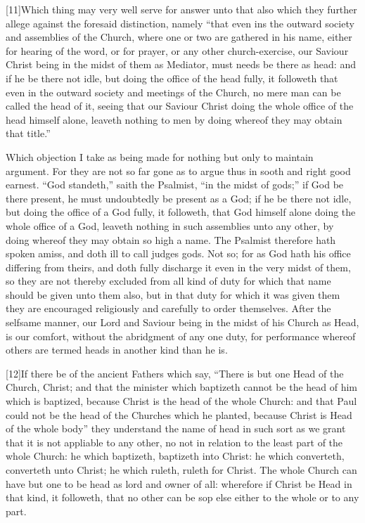 [11]Which thing may very well serve for answer unto that also which they further allege against the foresaid distinction, namely “that even ins the outward society and assemblies of the Church, where one or two are gathered in his name, either for hearing of the word, or for prayer, or any other church-exercise, our Saviour Christ being in the midst of them as Mediator, must needs be there as head: and if he be there not idle, but doing the office of the head fully, it followeth that even in the outward society and meetings of the Church, no mere man can be called the head of it, seeing that our Saviour Christ doing the whole office of the head himself alone, leaveth nothing to men by doing whereof they may obtain that title.”

Which objection I take as being made for nothing but only to maintain argument. For they are not so far gone as to argue thus in sooth and right good earnest. “God standeth,” saith the Psalmist, “in the midst of gods;” if God be there present, he must undoubtedly be present as a God; if he be there not idle, but doing the office of a God fully, it followeth,  that God himself alone doing the whole office of a God, leaveth nothing in such assemblies unto any other, by doing whereof they may obtain so high a name. The Psalmist therefore hath spoken amiss, and doth ill to call judges gods. Not so; for as God hath his office differing from theirs, and doth fully discharge it even in the very midst of them, so they are not thereby excluded from all kind of duty for which that name should be given unto them also, but in that duty for which it was given them they are encouraged religiously and carefully to order themselves. After the selfsame manner, our Lord and Saviour being in the midst of his Church as Head, is our comfort, without the abridgment of any one duty, for performance whereof others are termed heads in another kind than he is.

[12]If there be of the ancient Fathers which say, “There is but one Head of the Church, Christ; and that the minister which baptizeth cannot be the head of him which is baptized, because Christ is the head of the whole Church: and that Paul could not be the head of the Churches which he planted, because Christ is Head of the whole body” they understand the name of head in such sort as we grant that it is not appliable to any other, no not in relation to the  least part of the whole Church: he which baptizeth, baptizeth into Christ: he which converteth, converteth unto Christ; he which ruleth, ruleth for Christ. The whole Church can have but one to be head as lord and owner of all: wherefore if Christ be Head in that kind, it followeth, that no other can be sop else either to the whole or to any part.

